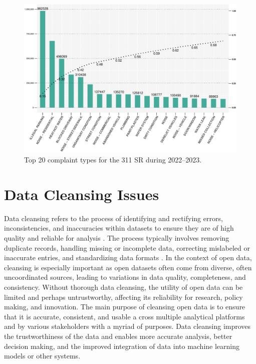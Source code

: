 \documentclass[linenumber]{jdsart}
\begin{document}
\begin{figure}[tbp]
 \centering
  \includegraphics[width = \textwidth]{SR_by_Complaint_Type.pdf} 
  \caption{Top 20 complaint types for the 311 SR during 2022--2023.} 
  \label{fig:SR_complaints}
\end{figure}


\section{Data Cleansing Issues} 
\label{sec:issues}
Data cleansing refers to the process of identifying and rectifying
errors, inconsistencies, and inaccuracies within datasets to ensure
they are of high quality and reliable for analysis
\citep{maletic2005data, hosseinzadeh2023data}. The process
typically involves removing duplicate records, handling missing or
incomplete data, correcting mislabeled or inaccurate entries, and
standardizing data formats \citep[e.g.,][]{cody2017cody,
  van2018statistical}. In the context of open data, cleansing is
especially important as open datasets often come from diverse,
often uncoordinated sources, leading to variations in data quality,
completeness, and consistency. Without thorough data cleansing, 
the utility of open data can be limited and perhaps 
untrustworthy, affecting its reliability for research, 
policy making, and innovation. The main purpose of cleansing 
open data is to ensure that it is accurate, consistent, and usable a
cross multiple analytical platforms and by various stakeholders with a 
myriad of purposes. Data cleansing improves the trustworthiness 
of the data and enables more accurate analysis, 
better decision making, and the improved integration of 
data into machine learning models or other systems.
\end{document}

